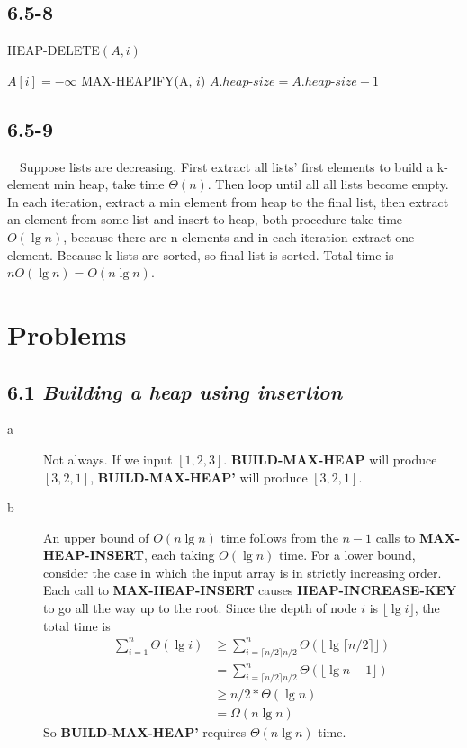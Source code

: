 \documentclass[10pt]{article}
\begin{document}
\subsection*{6.5-8}
\begin{algorithm}
\caption{HEAP-DELETE$(A, i)$}
\begin{algorithmic}[1]
\STATE $A[i] = -\infty$
\STATE MAX-HEAPIFY(A, $i$)
\STATE $A.heap\textrm{-}size = A.heap\textrm{-}size - 1$
\end{algorithmic}
\end{algorithm}



\subsection*{6.5-9}
~~Suppose lists are decreasing. First extract all lists' first elements to build a k-element min heap, take time $\Theta(n)$. Then loop until all all lists become empty. In each iteration, extract a min element from heap to the final list, then extract an element from some list and insert to heap, both procedure take time $O(\lg n)$, because there are n elements and in each iteration extract one element. Because k lists are sorted, so final list is sorted. Total time is $nO(\lg n) = O(n\lg n)$.

\section*{Problems}
\subsection*{6.1 \textit{\textbf{Building a heap using insertion}}}
\begin{description}
\item[a] Not always. If we input $[1, 2, 3]$. \textbf{BUILD-MAX-HEAP} will produce $[3, 2, 1]$, \textbf{BUILD-MAX-HEAP'} will produce $[3, 2, 1]$.
\item[b] An upper bound of $O(n\lg n)$ time follows from the $n-1$ calls to \textbf{MAX-HEAP-INSERT}, each taking $O(\lg n)$ time. For a lower bound, consider the case in which the input array is in strictly increasing order. Each call to \textbf{MAX-HEAP-INSERT} causes \textbf{HEAP-INCREASE-KEY} to go all the way up to the root. Since the depth of node $i$ is $\lfloor {\lg i} \rfloor$, the total time is
  \begin{align*}
    \sum_{i=1}^n\Theta(\lg i) &\ge \sum_{i=\lceil {n/2} \rceil {n/2}}^n\Theta(\lfloor {  \lg \lceil {n/2} \rceil \rfloor}) \\
                              & = \sum_{i=\lceil {n/2} \rceil {n/2}}^n\Theta(\lfloor {\lg{n} - 1} \rfloor) \\
                              & \ge n/2*\Theta(\lg n)\\
                              & = \Omega(n\lg n)
  \end{align*}
  So \textbf{BUILD-MAX-HEAP'} requires $\Theta(n\lg n)$ time.
\end{description}
\end{document}
